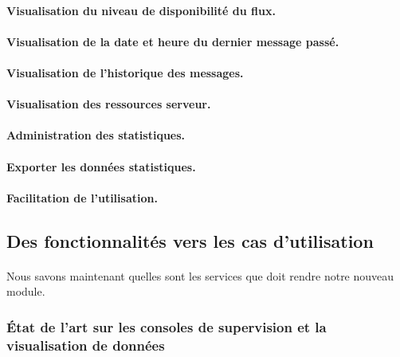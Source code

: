 			\paragraph{Visualisation du niveau de disponibilité du flux.}
			
			
			\paragraph{Visualisation de la date et heure du dernier message passé.}
			
			\paragraph{Visualisation de l’historique des messages.}
			
			\paragraph{Visualisation des ressources serveur.}
			
			\paragraph{Administration des statistiques.}
			
			\paragraph{Exporter les données statistiques.}
			
			\paragraph{Facilitation de l’utilisation.}
			
	
	\subsection{Des fonctionnalités vers les cas d'utilisation}
		\paragraph{}
		Nous savons maintenant quelles sont les services que doit rendre notre nouveau
		module.
		
		\subsubsection{État de l'art sur les consoles de supervision et la visualisation de données}
